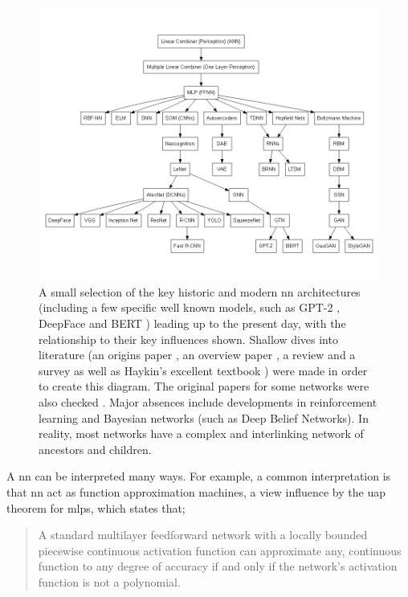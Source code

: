 \begin{figure}[H]
    \centering
    \includegraphics[width=140mm,scale=1.5]{figs/nn_architectures.png}
    \caption[Neural network architectures.]{A small selection of the key historic and modern \gls{nn} architectures (including a few specific well known models, such as GPT-2 \cite{gpt2}, DeepFace \cite{deep_face} and BERT \cite{bert}) leading up to the present day, with the relationship to their key influences shown. Shallow dives into literature (an origins paper \cite{dl_origin}, an overview paper \cite{dl_overview}, a review \cite{gnn_review} and a survey \cite{elm_survey} as well as Haykin's excellent textbook \cite{haykin}) were made in order to create this diagram. The original papers for some networks were also checked \cite{gaugan} \cite{bdnn} \cite{ltsm} \cite{bdnn} \cite{backprop_rumelhart}  \cite{gpt2} \cite{hopfieldnetworks} \cite{yolo}. Major absences include developments in reinforcement learning and Bayesian networks (such as Deep Belief Networks). In reality, most networks have a complex and interlinking network of ancestors and children.}
    \label{fig:nn_architectures}
\end{figure}

A \gls{nn} can be interpreted many ways. For example, a common interpretation is that \gls{nn} act as function approximation machines, a view influence by the \gls{uap} theorem for \gls{mlp}s, which states that;

\begin{quote}
    A standard multilayer feedforward network with a locally bounded piecewise continuous activation function can approximate any, continuous function to any degree of accuracy if and only if the network's activation function is not a polynomial.\cite{uap_mlp}
\end{quote}

